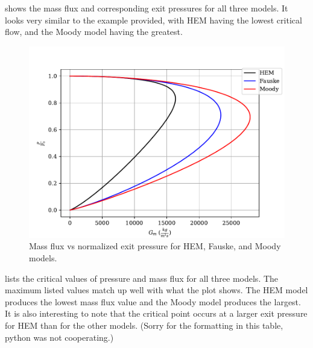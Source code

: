 \documentclass[11pt]{article}
\begin{document}
\clearpage
{} shows the mass flux and corresponding exit pressures for all three models. It looks very similar to the example provided, with HEM having the lowest critical flow, and the Moody model having the greatest.
\begin{figure}[htbp]
    \centering
    \includegraphics[width=\textwidth]{1-plots/graph_Gm.pdf}
    \caption{Mass flux vs normalized exit pressure for HEM, Fauske, and Moody models.}
    \label{fig:mass flow}
\end{figure}

 lists the critical values of pressure and mass flux for all three models. The maximum listed values match up well with what the plot shows. The HEM model produces the lowest mass flux value and the Moody model produces the largest. It is also interesting to note that the critical point occurs at a larger exit pressure for HEM than for the other models. (Sorry for the formatting in this table, python was not cooperating.)






\clearpage

\end{document}
